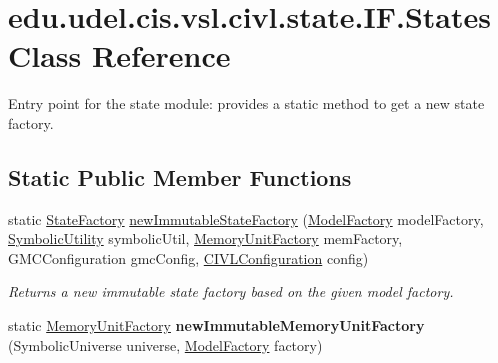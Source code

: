\hypertarget{classedu_1_1udel_1_1cis_1_1vsl_1_1civl_1_1state_1_1IF_1_1States}{}\section{edu.\+udel.\+cis.\+vsl.\+civl.\+state.\+I\+F.\+States Class Reference}
\label{classedu_1_1udel_1_1cis_1_1vsl_1_1civl_1_1state_1_1IF_1_1States}


Entry point for the state module\+: provides a static method to get a new state factory.  


\subsection*{Static Public Member Functions}
\begin{DoxyCompactItemize}
\item 
static \hyperlink{interfaceedu_1_1udel_1_1cis_1_1vsl_1_1civl_1_1state_1_1IF_1_1StateFactory}{State\+Factory} \hyperlink{classedu_1_1udel_1_1cis_1_1vsl_1_1civl_1_1state_1_1IF_1_1States_acef5163826941b40627cda90298848c7}{new\+Immutable\+State\+Factory} (\hyperlink{interfaceedu_1_1udel_1_1cis_1_1vsl_1_1civl_1_1model_1_1IF_1_1ModelFactory}{Model\+Factory} model\+Factory, \hyperlink{interfaceedu_1_1udel_1_1cis_1_1vsl_1_1civl_1_1dynamic_1_1IF_1_1SymbolicUtility}{Symbolic\+Utility} symbolic\+Util, \hyperlink{interfaceedu_1_1udel_1_1cis_1_1vsl_1_1civl_1_1state_1_1IF_1_1MemoryUnitFactory}{Memory\+Unit\+Factory} mem\+Factory, G\+M\+C\+Configuration gmc\+Config, \hyperlink{classedu_1_1udel_1_1cis_1_1vsl_1_1civl_1_1config_1_1IF_1_1CIVLConfiguration}{C\+I\+V\+L\+Configuration} config)
\begin{DoxyCompactList}\small\item\em Returns a new immutable state factory based on the given model factory. \end{DoxyCompactList}\item 
\hypertarget{classedu_1_1udel_1_1cis_1_1vsl_1_1civl_1_1state_1_1IF_1_1States_aadf8e9fafc7fb354765e5f8bd023a991}{}static \hyperlink{interfaceedu_1_1udel_1_1cis_1_1vsl_1_1civl_1_1state_1_1IF_1_1MemoryUnitFactory}{Memory\+Unit\+Factory} {\bfseries new\+Immutable\+Memory\+Unit\+Factory} (Symbolic\+Universe universe, \hyperlink{interfaceedu_1_1udel_1_1cis_1_1vsl_1_1civl_1_1model_1_1IF_1_1ModelFactory}{Model\+Factory} factory)\label{classedu_1_1udel_1_1cis_1_1vsl_1_1civl_1_1state_1_1IF_1_1States_aadf8e9fafc7fb354765e5f8bd023a991}

\end{DoxyCompactItemize}


